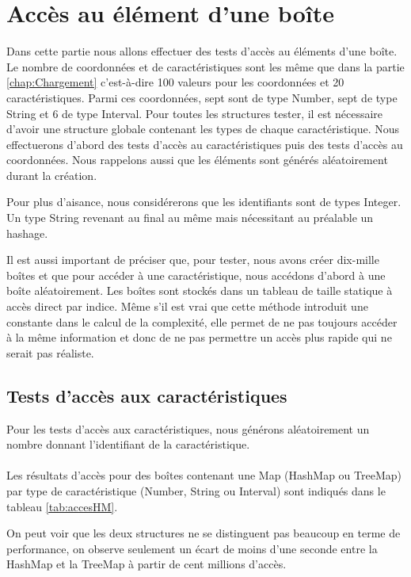 \section{Accès au élément d'une boîte}
Dans cette partie nous allons effectuer des tests d'accès au éléments d'une boîte. Le nombre de coordonnées et de caractéristiques sont les même que dans la partie \ref{chap:Chargement} c'est-à-dire 100 valeurs pour les coordonnées et 20 caractéristiques. Parmi ces coordonnées, sept sont de type Number, sept de type String et 6 de type Interval. Pour toutes les structures tester, il est nécessaire d'avoir une structure globale contenant les types de chaque caractéristique. Nous effectuerons d'abord des tests d'accès au caractéristiques puis des tests d'accès au coordonnées. Nous rappelons aussi que les éléments sont générés aléatoirement durant la création.

Pour plus d'aisance, nous considérerons que les identifiants sont de types Integer. Un type String revenant au final au même mais nécessitant au préalable un hashage.

Il est aussi important de préciser que, pour tester, nous avons créer dix-mille boîtes et que pour accéder à une caractéristique, nous accédons d'abord à une boîte aléatoirement. Les boîtes sont stockés dans un tableau de taille statique à accès direct par indice. Même s'il est vrai que cette méthode introduit une constante dans le calcul de la complexité, elle permet de ne pas toujours accéder à la même information et donc de ne pas permettre un accès plus rapide qui ne serait pas réaliste.

\subsection{Tests d'accès aux caractéristiques}
Pour les tests d'accès aux caractéristiques, nous générons aléatoirement un nombre donnant l'identifiant de la caractéristique.

\paragraph{} Les résultats d'accès pour des boîtes contenant une Map (HashMap ou TreeMap) par type de caractéristique (Number, String ou Interval) sont indiqués dans le tableau \ref{tab:accesHM}.

On peut voir que les deux structures ne se distinguent pas beaucoup en terme de performance, on observe seulement un écart de moins d'une seconde entre la HashMap et la TreeMap à partir de cent millions d'accès.


